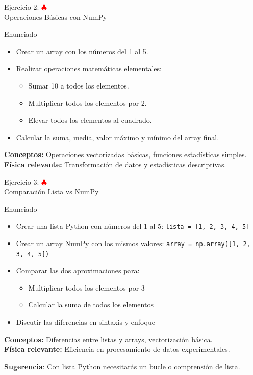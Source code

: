 \documentclass[10pt]{beamer}
\begin{document}
\begin{frame}{Ejercicio 2: \hfill \textcolor{red}{$\clubsuit$} \\ Operaciones Básicas con NumPy}
  \begin{block}{Enunciado}
    \begin{itemize}
      \item Crear un array con los números del 1 al 5.
      \item Realizar operaciones matemáticas elementales:
        \begin{itemize}
          \item Sumar 10 a todos los elementos.
          \item Multiplicar todos los elementos por 2.
          \item Elevar todos los elementos al cuadrado.
        \end{itemize}
      \item Calcular la suma, media, valor máximo y mínimo del array final.
    \end{itemize}
  \end{block}
  
  \textbf{Conceptos:} Operaciones vectorizadas básicas, funciones estadísticas simples.\\
  \textbf{Física relevante:} Transformación de datos y estadísticas descriptivas.
\end{frame}

\begin{frame}{Ejercicio 3: \hfill \textcolor{red}{$\clubsuit$} \\ Comparación Lista vs NumPy}
  \begin{block}{Enunciado}
    \begin{itemize}
      \item Crear una lista Python con números del 1 al 5: \texttt{lista = [1, 2, 3, 4, 5]}
      \item Crear un array NumPy con los mismos valores: \texttt{array = np.array([1, 2, 3, 4, 5])}
      \item Comparar las dos aproximaciones para:
        \begin{itemize}
          \item Multiplicar todos los elementos por 3
          \item Calcular la suma de todos los elementos
        \end{itemize}
      \item Discutir las diferencias en sintaxis y enfoque
    \end{itemize}
  \end{block}
  
  \textbf{Conceptos:} Diferencias entre listas y arrays, vectorización básica.\\
  \textbf{Física relevante:} Eficiencia en procesamiento de datos experimentales.
  
  \textbf{Sugerencia}: Con lista Python necesitarás un bucle o comprensión de lista.
\end{frame}
\end{document}
